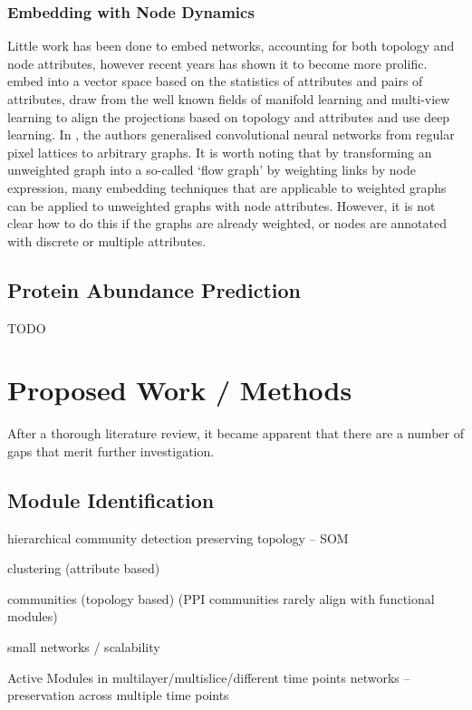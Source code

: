 \documentclass{report}
\begin{document}
	\subsection{Embedding with Node Dynamics}
	Little work has been done to embed networks, accounting for both topology and node attributes, however recent years has shown it to become more prolific. \cite{gibert2012graph} embed into a vector space based on the statistics of attributes and pairs of attributes, \cite{li2017attributed} draw from the well known fields of manifold learning and multi-view learning to align the projections based on topology and attributes and \cite{liao2017attributed} use deep learning. In \cite{niepert2016learning}, the authors generalised convolutional neural networks from regular pixel lattices to arbitrary graphs. It is worth noting that by transforming an unweighted graph into a so-called `flow graph' \cite{ISI:000293452500017} by weighting links by node expression, many embedding techniques that are applicable to weighted graphs can be applied to unweighted graphs with node attributes. However, it is not clear how to do this if the graphs are already weighted, or nodes are annotated with discrete or multiple attributes.
	
	\section{Protein Abundance Prediction}
	
	TODO

	
	\chapter{Proposed Work / Methods}
	
	After a thorough literature review, it became apparent that there are a number of gaps that merit further investigation. 
	
	\section{Module Identification}
	
	hierarchical community detection preserving topology -- SOM
	
	clustering (attribute based)
	
	communities (topology based) (PPI communities rarely align with functional modules)
	
	small networks / scalability
	
	
	Active Modules in multilayer/multislice/different time points networks
	-- preservation across multiple time points
	
\end{document}
